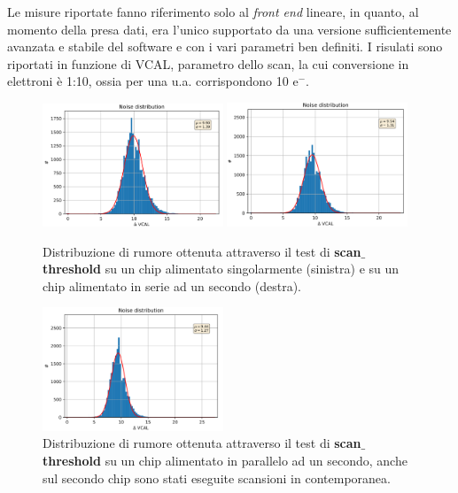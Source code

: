 Le misure riportate fanno riferimento solo al \textit{front end} lineare, in quanto, al momento della presa dati, era l'unico supportato da una versione sufficientemente avanzata e stabile del software e con i vari parametri ben definiti.
I risulati sono riportati in funzione di VCAL, parametro dello scan, la cui conversione in elettroni è 1:10, ossia per una u.a. corrispondono 10 $\mathrm{e^{-}}$.

\begin{figure}[h]
\centering
\includegraphics[width=0.48\textwidth]{Immagini/NoiseSingle}
\hfill
\includegraphics[width=0.48\textwidth]{Immagini/NoiseSerial}
\caption{Distribuzione di rumore ottenuta attraverso il test di \textbf{scan$\_$threshold} su un chip alimentato singolarmente (sinistra) e su un chip alimentato in serie ad un secondo (destra).}
\includegraphics[width=0.48\textwidth]{Immagini/NoiseParallel}
\caption{Distribuzione di rumore ottenuta attraverso il test di \textbf{scan$\_$threshold} su un chip alimentato in parallelo ad un secondo, anche sul secondo chip sono stati eseguite scansioni in contemporanea.}
\label{noiseparallel}
\label{noisesingle}
\label{noiseserial}
\end{figure}

